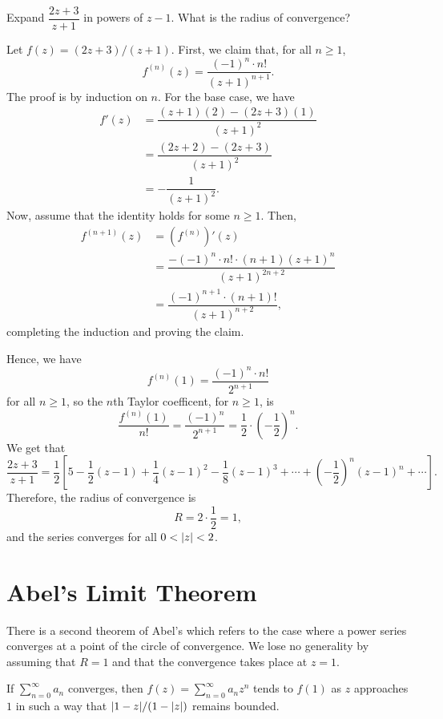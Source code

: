 \begin{exercise}
	Expand $\dfrac{2z+3}{z+1}$ in powers of $z-1$. What is the radius of convergence?
	
	\begin{sol}
		Let $f(z)=(2z+3)/(z+1)$. First, we claim that, for all $n \ge 1$, $$f^{(n)}(z)=\dfrac{(-1)^n \cdot n!}{(z+1)^{n+1}}.$$ The proof is by induction on $n$. For the base case, we have
		\begin{align*}
			f'(z) &=\dfrac{(z+1)(2)-(2z+3)(1)}{(z+1)^2} \\
			&=\dfrac{(2z+2)-(2z+3)}{(z+1)^2} \\
			&=-\dfrac{1}{(z+1)^2}.
		\end{align*}
		Now, assume that the identity holds for some $n \ge 1$. Then,
		\begin{align*}
			f^{(n+1)}(z) &=\left(f^{(n)}\right)'(z) \\
			&=\dfrac{-(-1)^{n} \cdot n! \cdot (n+1)(z+1)^n}{(z+1)^{2n+2}} \\
			&=\dfrac{(-1)^{n+1} \cdot (n+1)!}{(z+1)^{n+2}},
		\end{align*}
		completing the induction and proving the claim.
		
		Hence, we have $$f^{(n)}(1)=\dfrac{(-1)^n \cdot n!}{2^{n+1}}$$ for all $n \ge 1$, so the $n$th Taylor coefficent, for $n \ge 1$, is $$\dfrac{f^{(n)}(1)}{n!}=\dfrac{(-1)^n}{2^{n+1}}=\dfrac{1}{2} \cdot \left(-\dfrac{1}{2}\right)^n.$$ We get that $$\dfrac{2z+3}{z+1}=\dfrac{1}{2}\left[5-\dfrac{1}{2}(z-1)+\dfrac{1}{4}(z-1)^2-\dfrac{1}{8}(z-1)^3+\cdots+\left(-\dfrac{1}{2}\right)^{n}(z-1)^n+\cdots\right].$$ Therefore, the radius of convergence is $$R=2 \cdot \dfrac{1}{2}=\boxed{1},$$ and the series converges for all $0<\lvert z \rvert<2$.
	\end{sol}
\end{exercise}

\section{Abel's Limit Theorem}
There is a second theorem of Abel's which refers to the case where a power series converges at a point of the circle of convergence. We lose no generality by assuming that $R=1$ and that the convergence takes place at $z=1$.

\begin{theorem}[Abel]
	If $\sum_{n=0}^{\infty}a_n$ converges, then $f(z)=\sum_{n=0}^{\infty}a_nz^n$ tends to $f(1)$ as $z$ approaches $1$ in such a way that $\lvert 1-z \rvert/(1-\lvert z \rvert)$ remains bounded.
\end{theorem}

